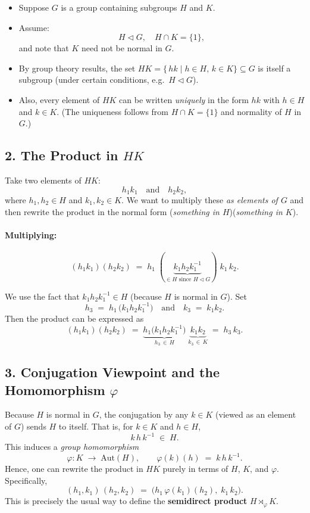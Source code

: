 \documentclass[12pt]{article}
\theoremstyle{definition} %
\theoremstyle{plain} %
\begin{document}
\begin{itemize}
    \item Suppose $G$ is a group containing subgroups $H$ and $K$.
    \item Assume:
    \[
      H \triangleleft G, \quad H \cap K = \{1\},
    \]
    and note that $K$ need not be normal in $G$.
    \item By group theory results, the set $HK = \{\,hk \mid h \in H,\, k \in K\}\subseteq G$ 
          is itself a subgroup (under certain conditions, e.g.\ $H\triangleleft G$).
    \item Also, every element of $HK$ can be written \emph{uniquely} in the form $hk$ 
          with $h\in H$ and $k\in K$. 
          (The uniqueness follows from $H \cap K = \{1\}$ and normality of $H$ in $G$.)
\end{itemize}

\subsection*{2. The Product in \boldmath$HK$}

Take two elements of $HK$:
\[
  h_1 k_1 \quad \text{and} \quad h_2 k_2,
\]
where $h_1, h_2 \in H$ and $k_1, k_2 \in K$. We want to multiply these \emph{as elements of $G$} 
and then rewrite the product in the normal form (\emph{something in $H$})(\emph{something in $K$}).

\paragraph{Multiplying:}
\[
  (h_1 k_1)(h_2 k_2)
  \;=\;
  h_1 \;(\underbrace{k_1 h_2 k_1^{-1}}_{\in H \text{ since }H\triangleleft G})\; k_1\,k_2.
\]

We use the fact that $k_1 h_2 k_1^{-1} \in H$ (because $H$ is normal in $G$). 
Set
\[
  h_3 \;=\; h_1 \,\bigl(k_1 h_2 k_1^{-1}\bigr) 
  \quad\text{and}\quad
  k_3 \;=\; k_1 k_2.
\]
Then the product can be expressed as
\[
  (h_1 k_1)(h_2 k_2)
  \;=\;
  \underbrace{h_1 \bigl(k_1 h_2 k_1^{-1}\bigr)}_{h_3 \,\in\, H}
  \;\underbrace{k_1 k_2}_{k_3 \,\in\, K}
  \;=\;
  h_3 \,k_3.
\]

\subsection*{3. Conjugation Viewpoint and the Homomorphism \boldmath$\varphi$}

Because $H$ is normal in $G$, the conjugation by any $k\in K$ (viewed as an element of $G$) 
sends $H$ to itself. That is, for $k \in K$ and $h \in H$,
\[
  k \,h\, k^{-1} \;\in\; H.
\]
This induces a \emph{group homomorphism}
\[
  \varphi : K \;\longrightarrow\; \mathrm{Aut}(H),
  \qquad
  \varphi(k)(h) \;=\; k \,h\, k^{-1}.
\]
Hence, one can rewrite the product in $HK$ purely in terms of $H$, $K$, and $\varphi$. 
Specifically,
\[
  (h_1, k_1)\,(h_2, k_2)
  \;=\;
  \bigl( h_1 \,\varphi(k_1)(h_2),\; k_1\,k_2\bigr).
\]
This is precisely the usual way to define the \textbf{semidirect product} $H \rtimes_\varphi K$.
\end{document}
